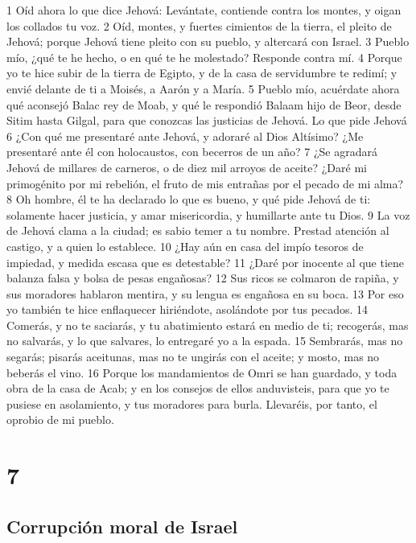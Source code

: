 1 Oíd ahora lo que dice Jehová: Levántate, contiende contra los montes, y oigan los collados tu voz.
2 Oíd, montes, y fuertes cimientos de la tierra, el pleito de Jehová; porque Jehová tiene pleito con su pueblo, y altercará con Israel.
3 Pueblo mío, ¿qué te he hecho, o en qué te he molestado? Responde contra mí.
4 Porque yo te hice subir de la tierra de Egipto, y de la casa de servidumbre te redimí; y envié delante de ti a Moisés, a Aarón y a María. 
5 Pueblo mío, acuérdate ahora qué aconsejó Balac rey de Moab, y qué le respondió Balaam hijo de Beor, desde Sitim hasta Gilgal, para que conozcas las justicias de Jehová.
Lo que pide Jehová
6 ¿Con qué me presentaré ante Jehová, y adoraré al Dios Altísimo? ¿Me presentaré ante él con holocaustos, con becerros de un año?
7 ¿Se agradará Jehová de millares de carneros, o de diez mil arroyos de aceite? ¿Daré mi primogénito por mi rebelión, el fruto de mis entrañas por el pecado de mi alma?
8 Oh hombre, él te ha declarado lo que es bueno, y qué pide Jehová de ti: solamente hacer justicia, y amar misericordia, y humillarte ante tu Dios.
9 La voz de Jehová clama a la ciudad; es sabio temer a tu nombre. Prestad atención al castigo, y a quien lo establece.
10 ¿Hay aún en casa del impío tesoros de impiedad, y medida escasa que es detestable?
11 ¿Daré por inocente al que tiene balanza falsa y bolsa de pesas engañosas?
12 Sus ricos se colmaron de rapiña, y sus moradores hablaron mentira, y su lengua es engañosa en su boca.
13 Por eso yo también te hice enflaquecer hiriéndote, asolándote por tus pecados.
14 Comerás, y no te saciarás, y tu abatimiento estará en medio de ti; recogerás, mas no salvarás, y lo que salvares, lo entregaré yo a la espada.
15 Sembrarás, mas no segarás; pisarás aceitunas, mas no te ungirás con el aceite; y mosto, mas no beberás el vino.
16 Porque los mandamientos de Omri se han guardado, y toda obra de la casa de Acab; y en los consejos de ellos anduvisteis, para que yo te pusiese en asolamiento, y tus moradores para burla. Llevaréis, por tanto, el oprobio de mi pueblo.

\chapter{7}

\section*{Corrupción moral de Israel}

